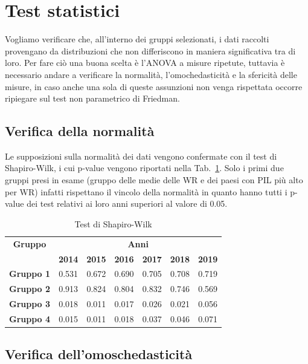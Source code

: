 \documentclass[conference]{IEEEtran}
\begin{document}
\section{Test statistici}

Vogliamo verificare che, all'interno dei gruppi selezionati,
i dati raccolti provengano da distribuzioni che non differiscono
in maniera significativa tra di loro.
Per fare ciò una buona scelta è l'ANOVA a misure ripetute,
tuttavia è necessario andare a verificare la normalità,
l'omochedasticità e la sfericità delle misure, in caso
anche una sola di queste assunzioni non venga rispettata occorre
ripiegare sul test non parametrico di Friedman.

\subsection{Verifica della normalità}

Le supposizioni sulla normalità dei dati vengono confermate
con il test di Shapiro-Wilk, i cui p-value vengono riportati nella Tab.~\ref{tab1}.
Solo i primi due gruppi presi in esame (gruppo delle medie delle WR e dei paesi con PIL più alto per WR)
infatti rispettano il vincolo della normalità
in quanto hanno tutti i p-value dei test relativi ai loro anni superiori al valore di 0.05.
\begin{table}[htbp]
    \caption{Test di Shapiro-Wilk}
    \begin{center}
    \begin{tabular}{|c|c|c|c|c|c|c|}
    \hline
    \textbf{Gruppo}&\multicolumn{6}{|c|}{\textbf{Anni}} \\
    \cline{2-7} 
     & \textbf{2014} & \textbf{2015} & \textbf{2016} & \textbf{2017} & \textbf{2018} & \textbf{2019}\\
    \hline
    \textbf{Gruppo 1} & 0.531 & 0.672 & 0.690 & 0.705 & 0.708 & 0.719 \\\cline{1-7}
    \textbf{Gruppo 2} & 0.913 & 0.824 & 0.804 & 0.832 & 0.746 & 0.569 \\\cline{1-7}
    \textbf{Gruppo 3} & 0.018 & 0.011 & 0.017 & 0.026 & 0.021 & 0.056 \\\cline{1-7}
    \textbf{Gruppo 4} & 0.015 & 0.011 & 0.018 & 0.037 & 0.046 & 0.071 \\\cline{1-7}
    \hline
    \end{tabular}
    \label{tab1}
    \end{center}
\end{table}

\subsection{Verifica dell'omoschedasticità}
\end{document}
